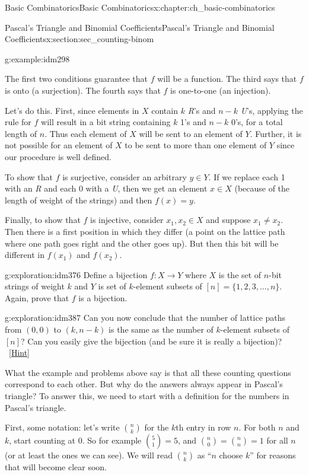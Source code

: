 \documentclass[oneside,10pt,]{book}
\numberwithin{equation}{chapter}
\begin{document}
\begin{chapterptx}{Basic Combinatorics}{}{Basic Combinatorics}{}{}{x:chapter:ch_basic-combinatorics}
\begin{sectionptx}{Pascal's Triangle and Binomial Coefficients}{}{Pascal's Triangle and Binomial Coefficients}{}{}{x:section:sec_counting-binom}
\begin{example}{}{g:example:idm298}
\begin{enumerate}
\end{enumerate}
The first two conditions guarantee that \(f\) will be a function.  The third says that \(f\) is onto (a surjection).  The fourth says that \(f\) is one-to-one (an injection).%
\par
Let's do this.  First, since elements in \(X\) contain \(k\) \emph{R}'s and \(n-k\) \emph{U}'s, applying the rule for \(f\) will result in a bit string containing \(k\) 1's and \(n-k\) 0's, for a total length of \(n\).  Thus each element of \(X\) will be sent to an element of \(Y\).  Further, it is not possible for an element of \(X\) to be sent to more than one element of \(Y\) since our procedure is well defined.%
\par
To show that \(f\) is surjective, consider an arbitrary \(y \in Y\).  If we replace each 1 with an \emph{R} and each 0 with a \emph{U}, then we get an element \(x \in X\) (because of the length of weight of the strings) and then \(f(x) = y\).%
\par
Finally, to show that \(f\) is injective, consider \(x_1, x_2 \in X\) and suppose \(x_1 \ne x_2\).  Then there is a first position in which they differ (a point on the lattice path where one path goes right and the other goes up).  But then this bit will be different in \(f(x_1)\) and \(f(x_2)\).%
\end{example}
\begin{exploration}{}{g:exploration:idm376}%
Define a bijection \(f:X \to Y\) where \(X\) is the set of \(n\)-bit strings of weight \(k\) and \(Y\) is set of \(k\)-element subsets of \([n] = \{1,2,3,\ldots, n\}\).  Again, prove that \(f\) is a bijection.%
\end{exploration}
\begin{exploration}{}{g:exploration:idm387}%
Can you now conclude that the number of lattice paths from \((0,0)\) to \((k,n-k)\) is the same as the number of \(k\)-element subsets of \([n]\)?  Can you easily give the bijection (and be sure it is really a bijection)?%
\qquad~\hfill{\tiny\hyperlink{g:hint:idm394-back}{[Hint]}}\end{exploration}
What the example and problems above say is that all these counting questions correspond to each other.  But why do the answers always appear in Pascal's triangle?  To answer this, we need to start with a definition for the numbers in Pascal's triangle.%
\par
First, some notation: let's write \(\binom{n}{k}\) for the \(k\)th entry in row \(n\).  For both \(n\) and \(k\), start counting at 0.  So for example \(\binom{5}{1} = 5\), and \(\binom{n}{0} = \binom{n}{n} = 1\) for all \(n\) (or at least the ones we can see).  We will read \(\binom{n}{k}\) as ``\(n\) choose \(k\)'' for reasons that will become clear soon.%

\end{sectionptx}
\end{chapterptx}
\end{document}
